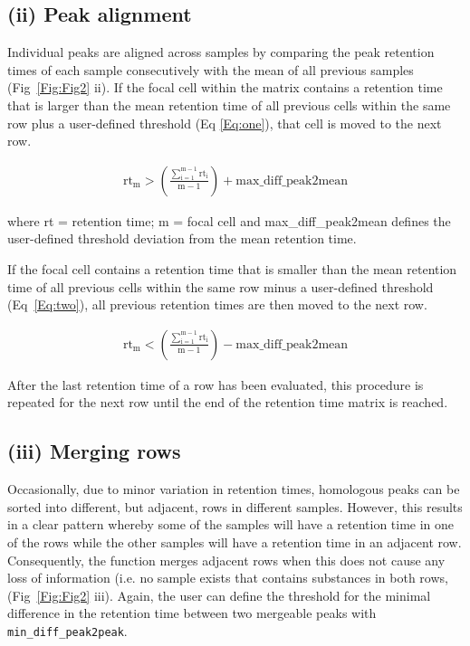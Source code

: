 \documentclass[10pt,letterpaper]{article}
\begin{document}
\subsection*{(ii) Peak alignment}
Individual peaks are aligned across samples by comparing the peak retention times of each sample consecutively with the mean of all previous samples (Fig~\ref{Fig:Fig2} ii). If the focal cell within the matrix contains a retention time that is larger than the mean retention time of all previous cells within the same row plus a user-defined threshold (Eq \eqref{Eq:one}), that cell is moved to the next row.

\begin{eqnarray}
\label{Eq:one}
\mathrm{rt_m} > \left(\frac{\mathrm{\sum_{i=1}^{m-1}rt_{i}}}{\mathrm{m}-1}\right) + \mathrm{max\_diff\_peak2mean}
\end{eqnarray}

where rt = retention time; m = focal cell and max\_diff\_peak2mean defines the user-defined threshold deviation from the mean retention time.

If the focal cell contains a retention time that is smaller than the mean retention time of all previous cells within the same row minus a user-defined threshold (Eq~\eqref{Eq:two}), all previous retention times are then moved to the next row.

\begin{eqnarray}
\label{Eq:two}
\mathrm{rt_m} < \left(\frac{\mathrm{\sum_{i=1}^{m-1}rt_{i}}}{\mathrm{m}-1}\right) - \mathrm{max\_diff\_peak2mean}
\end{eqnarray}

After the last retention time of a row has been evaluated, this procedure is repeated for the next row until the end of the retention time matrix is reached.

\subsection*{(iii)  Merging rows}
Occasionally, due to minor variation in retention times, homologous peaks can be sorted into different, but adjacent, rows in different samples. However, this results in a clear pattern whereby some of the samples will have a retention time in one of the rows while the other samples will have a retention time in an adjacent row. Consequently, the function merges adjacent rows when this does not cause any loss of information (i.e. no sample exists that contains substances in both rows, (Fig~\ref{Fig:Fig2} iii). Again, the user can define the threshold for the minimal difference in the retention time between two mergeable peaks with \texttt{min\_diff\_peak2peak}. \par 
\end{document}
